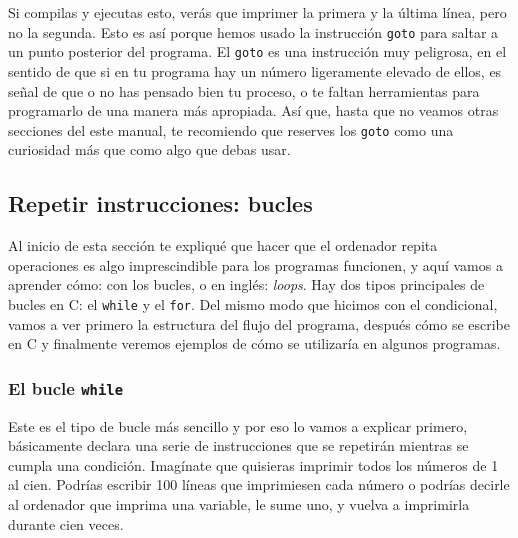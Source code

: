 \documentclass[a4paper]{article}
\begin{document}
Si compilas y ejecutas esto, verás que imprimer la primera y la última línea,
pero no la segunda. Esto es así porque hemos usado la instrucción \verb!goto!
para saltar a un punto posterior del programa. El \verb!goto! es una instrucción
muy peligrosa, en el sentido de que si en tu programa hay un número ligeramente
elevado de ellos, es señal de que o no has pensado bien tu proceso, o te faltan
herramientas para programarlo de una manera más apropiada. Así que, hasta que no
veamos otras secciones del este manual, te recomiendo que reserves los
\verb!goto! como una curiosidad más que como algo que debas usar.

\subsection{Repetir instrucciones: bucles}
Al inicio de esta sección te expliqué que hacer que el ordenador repita
operaciones es algo imprescindible para los programas funcionen, y aquí vamos
a aprender cómo: con los bucles, o en inglés: \textit{loops}. Hay dos tipos
principales de bucles en C: el \lstinline[style=C]!while! y el
\lstinline[style=C]!for!.
Del mismo modo que
hicimos con el condicional, vamos a ver primero la estructura del flujo del
programa, después cómo se escribe en C y finalmente veremos ejemplos de cómo
se utilizaría en algunos programas.

\subsubsection{El bucle \texttt{while}}
Este es el tipo de bucle más sencillo y por eso lo vamos a explicar primero,
básicamente declara una serie de instrucciones que se repetirán mientras se
cumpla una condición. Imagínate que quisieras imprimir todos los números de 1
al cien. Podrías escribir 100 líneas que imprimiesen cada número o podrías
decirle al ordenador que imprima una variable, le sume uno, y vuelva a
imprimirla durante cien veces.
\end{document}
